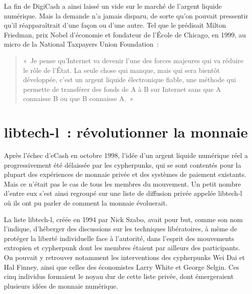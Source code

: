 La fin de DigiCash a ainsi laissé un vide sur le marché de l'argent liquide numérique. Mais la demande n'a jamais disparu, de sorte qu'on pouvait pressentir qu'il réapparaîtrait d'une façon ou d'une autre. Tel que le prédisait Milton Friedman, prix Nobel d'économie et fondateur de l'École de Chicago, en 1999, au micro de la National Taxpayers Union Foundation~:

\begin{quote}
«~Je pense qu'Internet va devenir l'une des forces majeures qui va réduire le rôle de l'État. La seule chose qui manque, mais qui sera bientôt développée, c'est un argent liquide électronique fiable, une méthode qui permette de transférer des fonds de A à B sur Internet sans que A connaisse B ou que B connaisse A.~»
\end{quote} %

\section*{libtech-l~: révolutionner la monnaie}

Après l'échec d'eCash en octobre 1998, l'idée d'un argent liquide numérique réel a progressivement été délaissée par les cypherpunks, qui se sont contentés pour la plupart des expériences de monnaie privée et des systèmes de paiement existants. Mais ce n'était pas le cas de tous les membres du mouvement. Un petit nombre d'entre eux s'est ainsi regroupé sur une liste de diffusion privée appelée libtech-l où ils ont pu parler de comment la monnaie évoluerait.

La liste libtech-l, créée en 1994 par Nick Szabo, avait pour but, comme son nom l'indique, d'héberger des discussions sur les techniques libératoires, à même de protéger la liberté individuelle face à l'autorité, dans l'esprit des mouvements extropien et cypherpunk dont les membres étaient par ailleurs des participants. On pouvait y retrouver notamment les interventions des cypherpunks Wei Dai et Hal Finney, ainsi que celles des économistes Larry White et George Selgin. Ces cinq individus formaient le noyau dur de cette liste privée, dont émergeraient plusieurs idées de monnaie numérique.

